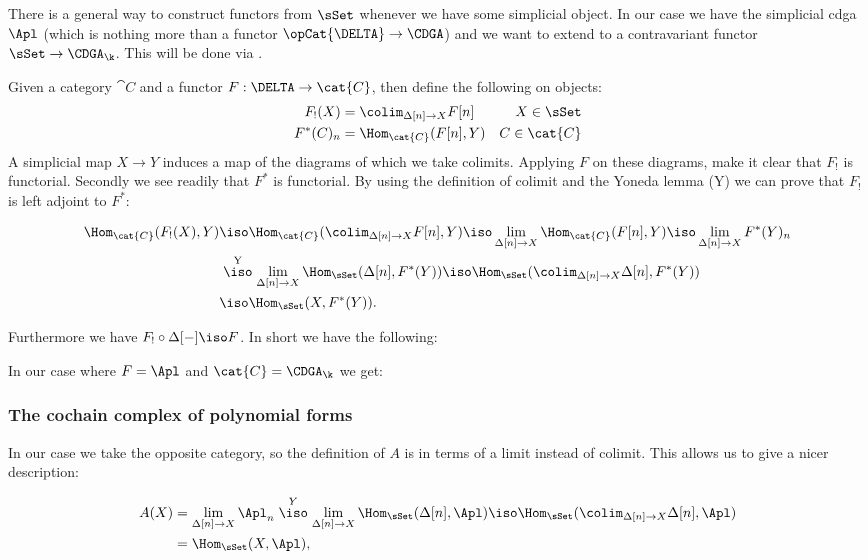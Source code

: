 
There is a general way to construct functors from $\sSet$ whenever we have some simplicial object. In our case we have the simplicial cdga $\Apl$ (which is nothing more than a functor $\opCat{\DELTA} \to \CDGA$) and we want to extend to a contravariant functor $\sSet \to \CDGA_\k$. This will be done via .

Given a category $\cat{C}$ and a functor $F: \DELTA \to \cat{C}$, then define the following on objects:
\begin{align*}
	F_!(X)      &= \colim_{\Delta[n] \to X} F[n] & X \in \sSet \\
	F^\ast(C)_n &= \Hom_{\cat{C}}(F[n], Y)       & C \in \cat{C}
\end{align*}
A simplicial map $X \to Y$ induces a map of the diagrams of which we take colimits. Applying $F$ on these diagrams, make it clear that $F_!$ is functorial. Secondly we see readily that $F^\ast$ is functorial. By using the definition of colimit and the Yoneda lemma (Y) we can prove that $F_!$ is left adjoint to $F^\ast$:

\begin{align*}
	\Hom_\cat{C}(F_!(X), Y) &\iso \Hom_\cat{C}(\colim_{\Delta[n] \to X} F[n], Y) \iso \lim_{\Delta[n] \to X} \Hom_\cat{C}(F[n], Y) \iso \lim_{\Delta[n] \to X} F^\ast(Y)_n \\
	&\stackrel{\text{Y}}{\iso} \lim_{\Delta[n] \to X} \Hom_\sSet(\Delta[n], F^\ast(Y)) \iso \Hom_\sSet(\colim_{\Delta[n] \to X} \Delta[n], F^\ast(Y)) \\
	&\iso \Hom_\sSet(X, F^\ast(Y)).
\end{align*}

Furthermore we have $F_! \circ \Delta[-] \iso F$. In short we have the following:


In our case where $F = \Apl$ and $\cat{C} = \CDGA_\k$ we get:



\subsubsection{The cochain complex of polynomial forms}

In our case we take the opposite category, so the definition of $A$ is in terms of a limit instead of colimit. This allows us to give a nicer description:

\begin{align*}
	A(X) &= \lim_{\Delta[n] \to X} \Apl_n \stackrel{Y}{\iso} \lim_{\Delta[n] \to X} \Hom_\sSet(\Delta[n], \Apl) \iso \Hom_\sSet(\colim_{\Delta[n] \to X}\Delta[n], \Apl) \\
	&= \Hom_\sSet(X, \Apl),
\end{align*}

